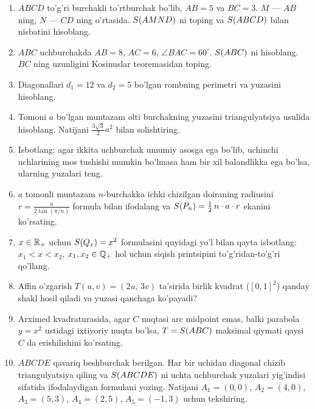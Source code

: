 \begin{enumerate}[leftmargin=*, label=\textbf{\arabic*.}]

\item
$ABCD$ to'g'ri burchakli to'rtburchak bo'lib, $AB=5$ va $BC=3$.
$M$ — $AB$ ning, $N$ — $CD$ ning o'rtasida.
$S\!\left(AMND\right)$ ni toping va $S\!\left(ABCD\right)$ bilan nisbatini hisoblang.

\item
$ABC$ uchburchakda $AB = 8$, $AC = 6$, $\angle BAC = 60^\circ$.
$S\!\left(ABC\right)$ ni hisoblang.
$BC$ ning uzunligini Kosinuslar teoremasidan toping.

\item
Diagonallari $d_1 = 12$ va $d_2 = 5$ bo'lgan rombning perimetri va yuzasini
hisoblang.

\item
Tomoni $a$ bo'lgan muntazam olti burchakning yuzasini triangulyatsiya usulida
hisoblang.
Natijani $\tfrac{3\sqrt{3}}{2}a^2$ bilan solishtiring.

\item
Isbotlang: agar ikkita uchburchak umumiy asosga ega bo'lib, uchinchi uchlarining
mos tushishi mumkin bo'lmasa ham bir xil balandlikka ega bo'lsa, ularning
yuzalari teng.

\item
$a$ tomonli muntazam $n$-burchakka ichki chizilgan doiraning radiusini
$r = \tfrac{a}{2\tan(\pi/n)}$ formula bilan ifodalang va
$S\!\left(P_n\right) = \tfrac{1}{2}\,n\cdot a \cdot r$ ekanini ko'rsating.

\item
$x \in \mathbb{R}_{+}$ uchun $S\!\left(Q_x\right) = x^2$ formulasini quyidagi yo'l bilan qayta
isbotlang: $x_1 < x < x_2$, $x_1, x_2 \in \mathbb{Q}_{+}$ hol uchun siqish printsipini
to'g'ridan-to'g'ri qo'llang.

\item
Affin o'zgarish $T(u,v)=(2u,\,3v)$ ta'sirida birlik kvadrat ($[0,1]^2$) qanday
shakl hosil qiladi va yuzasi qanchaga ko'payadi?

\item
Arximed kvadraturasida, agar $C$ nuqtasi arc midpoint emas, balki parabola
$y = x^2$ ustidagi ixtiyoriy nuqta bo'lsa, $T = S\!\left(ABC\right)$ maksimal qiymati
qaysi $C$ da erishilishini ko'rsating.

\item[\textbf{10*.}]
$ABCDE$ qavariq beshburchak berilgan.
Har bir uchidan diagonal chizib triangulyatsiya qiling va
$S\!\left(ABCDE\right)$ ni uchta uchburchak yuzalari yig'indisi sifatida ifodalaydigan
formulani yozing.
Natijani $A_1=(0,0)$, $A_2=(4,0)$, $A_3=(5,3)$, $A_4=(2,5)$, $A_5=(-1,3)$
uchun tekshiring.

\end{enumerate}
